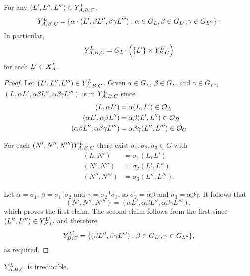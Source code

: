 \documentclass[a4paper, 11pt]{report}
\begin{document}
\begin{lemma}
For any $(L',L'',L''')\in\yprod[L]{A,B,C}$,
\begin{equation*}
\yprod[L]{A,B,C} = \left\{ \alpha\cdot (L',\beta L'',\beta\gamma L'''): \alpha\in G_L, \beta\in G_{L'}, \gamma\in G_{L''}\right\}.
\end{equation*}
In particular,
\begin{equation*}
\yprod[L]{A,B,C} = G_L\cdot\left(\{L'\}\times\yprod[L']{B,C}\right)
\end{equation*}
for each $L'\in\xprod[L]{A}$.
\end{lemma}

\begin{proof}
Let $(L',L'',L''')\in\yprod[L]{A,B,C}$. Given $\alpha\in G_{L}$, $\beta\in G_{L'}$ and $\gamma\in G_{L''}$, $(L,\alpha L',\alpha\beta L'', \alpha\beta\gamma L''')$ is in $\yprod[L]{A,B,C}$ since
\begin{align*}
(L,\alpha L') &= \alpha (L,L')\in\orbit{A}\\
(\alpha L', \alpha\beta L'') &= \alpha\beta (L',L'')\in\orbit{B}\\
(\alpha\beta L'',\alpha\beta\gamma L''') &= \alpha\beta\gamma (L'',L''')\in\orbit{C}
\end{align*}

For each $(N',N'',N''')\yprod[L]{A,B,C}$ there exist $\sigma_1,\sigma_2,\sigma_3\in G$ with
\begin{align*}
(L,N') &= \sigma_1(L,L')\\
(N',N'') &= \sigma_2(L',L'')\\
(N'',N''') &= \sigma_3(L'',L''').
\end{align*}

Let $\alpha = \sigma_1$, $\beta = \sigma_1^{-1}\sigma_2$ and $\gamma = \sigma_2^{-1}\sigma_3$, so $\sigma_2=\alpha\beta$ and $\sigma_3=\alpha\beta\gamma$. It follows that
\begin{equation*}
(N',N'',N''') = (\alpha L',\alpha\beta L'', \alpha\beta\gamma L'''),
\end{equation*}
which proves the first claim. The second claim follows from the first since $(L'',L''')\in\yprod[L']{B,C}$ and therefore
\begin{equation*}
\yprod[L']{B,C} = \{(\beta L'',\beta\gamma L'''):\beta\in G_{L'}, \gamma\in G_{L''}\},
\end{equation*}
as required.
\end{proof}


\begin{lemma}\label{lemma:irreducible-y-triple}
$\yprod[L]{A,B,C}$ is irreducible.
\end{lemma}
\end{document}
